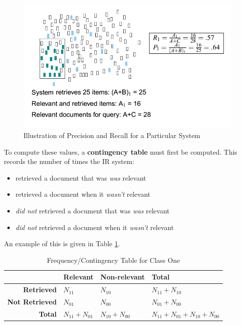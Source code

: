 \documentclass{article}
\begin{document}
\begin{figure}
	\centering
	\includegraphics[scale=0.45]{figures/precision-recall.png}
	\caption{Illustration of Precision and Recall for a Particular System}
	\label{fig:recall-precision-vis}
\end{figure}

To compute these values, a \textbf{contingency table} must first be computed. This records the number of times the IR system:
\begin{itemize}
	\item retrieved a document that was \textit{was} relevant
	\item retrieved a document when it \textit{wasn't} relevant
	\item \textit{did not} retrieved a document that was \textit{was} relevant
	\item \textit{did not} retrieved a document when it \textit{wasn't} relevant
\end{itemize}
An example of this is given in Table \ref{tab:example-contingency}.

\begin{table}[H]
	\centering
	\begin{tabular}{|r|l|l|l|}
		\hline
		& \textbf{Relevant} & \textbf{Non-relevant} & \textbf{Total} \\
		\hline
		\textbf{Retrieved} & $N_{11}$ & $N_{10}$ & $N_{11} + N_{10}$ \\
		\textbf{Not Retrieved} & $N_{01}$ & $N_{00}$ & $N_{01} + N_{00}$ \\
		\hline
		\textbf{Total} & $N_{11} + N_{01}$ & $N_{10} + N_{00}$  & $N_{11} + N_{01} + N_{10} + N_{00}$ \\
		\hline
	\end{tabular}
	\caption{Frequency/Contingency Table for Class One}
	\label{tab:example-contingency}
\end{table}
\end{document}
